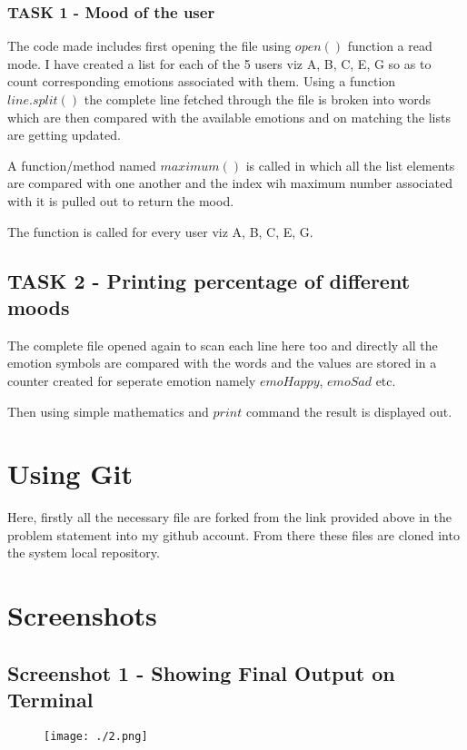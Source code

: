 \documentclass[a4paper,10pt]{article}
\begin{document}
\subsubsection{TASK 1 - Mood of the user}

The code made includes first opening the file using $open()$ function a read mode.
I have created a list for each of the 5 users viz A, B, C, E, G so as to count corresponding emotions associated with them.
Using a function $line.split()$ the complete line fetched through the file is broken into words which are then compared with the available emotions
and on matching the lists are getting updated.

A function/method named $maximum()$ is called in which all the list elements are compared with one another and the index wih maximum number associated 
with it is pulled out to return the mood.

The function is called for every user viz A, B, C, E, G.

\subsection{TASK 2 - Printing percentage of different moods}

The complete file opened again to scan each line here too and directly all the emotion symbols are compared with the words and the values
are stored in a counter created for seperate emotion namely $emoHappy$, $emoSad$ etc.

Then using simple mathematics and $print$ command the result is displayed out.

\section{Using Git}

Here, firstly all the necessary file are forked from the link provided above in the problem statement into my github account.
From there these files are cloned into the system local repository.

\newpage %
\section{Screenshots}
\subsection{Screenshot 1 - Showing Final Output on Terminal}
\begin{figure}[h]
 \centering
 \texttt{[image: ./2.png]}
\end{figure}
\end{document}
